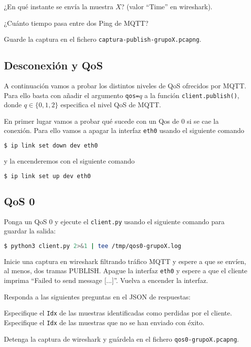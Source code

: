 \documentclass{upmassignment}
\begin{document}
\begin{problemlist}
    \pbitem ¿En qué instante
        se envía la muestra $X$?
        (valor ``Time'' en wireshark).

    \pbitem ¿Cuánto tiempo
        pasa entre dos 
        Ping de MQTT?
\end{problemlist}

Guarde la captura en el fichero
\texttt{captura-publish-grupoX.pcapng}.


\subsection*{Desconexión y QoS}
\noindent A continuación vamos a probar
los distintos niveles de QoS ofrecidos
por MQTT. Para ello basta con
añadir el argumento
\texttt{qos=$q$} a la función
\texttt{client.publish()}, donde
$q\in\{0,1,2\}$ especifica el nivel
QoS de MQTT.

En primer lugar vamos a probar
qué sucede con un Qos de 0 si se
cae la conexión. Para ello vamos a
apagar la interfaz
\texttt{eth0} usando el
siguiente comando
\begin{lstlisting}[language=bash]
$ ip link set down dev eth0
\end{lstlisting}
y la encenderemos con el siguiente comando
\begin{lstlisting}[language=bash]
$ ip link set up dev eth0
\end{lstlisting}



\subsection*{QoS 0}
\noindent
Ponga un QoS 0 y ejecute el
\texttt{client.py} usando el
siguiente comando para guardar la salida:
\begin{lstlisting}[language=bash]
$ python3 client.py 2>&1 | tee /tmp/qos0-grupoX.log
\end{lstlisting}

Inicie una
captura en wireshark filtrando
tráfico MQTT y espere a que
se envíen, al menos, dos tramas
PUBLISH. Apague la interfaz
\texttt{eth0} y espere a que
el cliente imprima
``Failed to send message [...]''.
Vuelva a encender la interfaz.


Responda a las siguientes preguntas
en el JSON de respuestas:
\begin{problemlist}
    \pbitem Especifique el \verb|Idx|
        de las muestras identificadas
        como perdidas por el cliente.
    \pbitem Especifique el \verb|Idx|
        de las muestras que no se
        han enviado con éxito.
\end{problemlist}
Detenga la captura de wireshark y
guárdela en el fichero
\texttt{qos0-grupoX.pcapng}.
\end{document}
